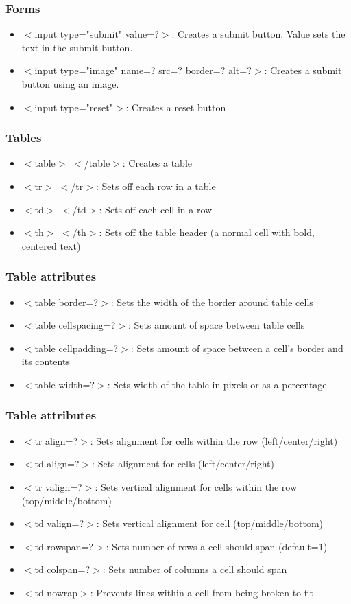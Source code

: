 \documentclass{beamer}
\begin{document}
\begin{frame}
\frametitle{Forms}
\begin{itemize}
  \item   $<$input type="submit" value=?$>$:  Creates a submit button.  Value sets the text in the  submit button.
  \item   $<$input type="image" name=? src=? border=? alt=?$>$:  Creates a submit button using an image. 
 \item   $<$input type="reset"$>$:  Creates a reset button
\end{itemize}
\end{frame}
\begin{frame}
\frametitle{Tables}
\begin{itemize}
  \item   $<$table$>$ $<$/table$>$:  Creates a table
   \item   $<$tr$>$ $<$/tr$>$:  Sets off each row in a table
  \item    $<$td$>$ $<$/td$>$:  Sets off each cell in a row
   \item   $<$th$>$ $<$/th$>$:  Sets off the table header (a normal cell with bold,
 centered text)
\end{itemize}
\end{frame}
\begin{frame}
\frametitle{Table attributes }
\begin{itemize}
  \item    $<$table border=?$>$:  Sets the width of the border around table cells
  \item   $<$table cellspacing=?$>$:  Sets amount of space between table cells
  \item   $<$table cellpadding=?$>$:  Sets amount of space between a cell's border and  its contents
  \item   $<$table width=?$>$:  Sets width of the table in pixels or as a percentage
\end{itemize}
\end{frame}
\begin{frame}
\frametitle{Table attributes }
\begin{itemize}
  \item    $<$tr align=?$>$:  Sets alignment for cells within the row
 (left/center/right)
 \item     $<$td align=?$>$:  Sets alignment for cells (left/center/right)
 \item     $<$tr valign=?$>$:  Sets vertical alignment for cells within the row
 (top/middle/bottom)
 \item     $<$td valign=?$>$:  Sets vertical alignment for cell (top/middle/bottom)
  \item    $<$td rowspan=?$>$:  Sets number of rows a cell should span (default=1)
  \item    $<$td colspan=?$>$:  Sets number of columns a cell should span
  \item    $<$td nowrap$>$:  Prevents lines within a cell from being broken to fit
\end{itemize}
\end{frame}
\end{document}
